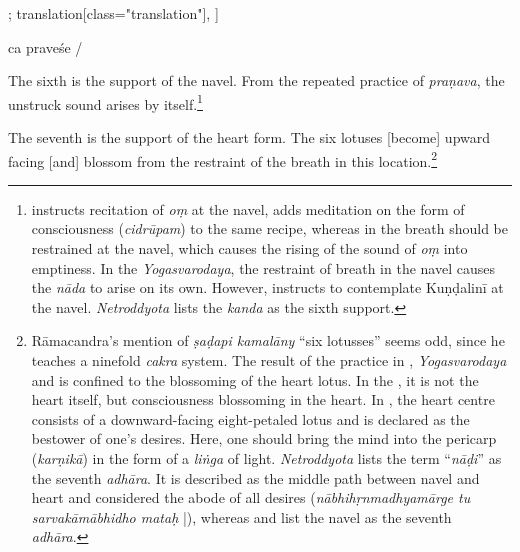 \begin{alignment}[
  texts=edition[class="edition"];
  translation[class="translation"],
  ]
\begin{edition}
\begin{prose}
{  }
ca 
praveśe
/
    \end{prose}
  \end{edition}
  \begin{translation}
    \begin{tlate}
      \noindent
      The sixth is the support of the navel. From the repeated practice of \textit{praṇava}, the unstruck sound arises by itself.\footnote{ instructs recitation of \textit{oṃ} at the navel,  adds meditation on the form of consciousness (\textit{cidrūpam}) to the same recipe, whereas in  the breath should be restrained at the navel, which causes the rising of the sound of \textit{oṃ} into emptiness. In the \textit{Yogasvarodaya}, the restraint of breath in the navel causes the \textit{nāda} to arise on its own. However,  instructs to contemplate Kuṇḍalinī at the navel. \textit{Netroddyota} lists the \textit{kanda} as the sixth support.}

     The seventh is the support of the heart form. The six lotuses [become] upward facing [and] blossom from the restraint of the breath in this location.\footnote{Rāmacandra's mention of \textit{ṣaḍapi kamalāny} ``six lotusses'' seems odd, since he teaches a ninefold \textit{cakra} system. The result of the practice in , \textit{Yogasvarodaya} and  is confined to the blossoming of the heart lotus. In the , it is not the heart itself, but consciousness blossoming in the heart. In , the heart centre consists of a downward-facing eight-petaled lotus and is declared as the bestower of one's desires. Here, one should bring the mind into the pericarp (\textit{karṇikā}) in the form of a \textit{liṅga} of light. \textit{Netroddyota} lists the term ``\textit{nāḍi}'' as the seventh \textit{adhāra}. It is described as the middle path between navel and heart and considered the abode of all desires (\textit{nābhihṛnmadhyamārge tu sarvakāmābhidho mataḥ} |), whereas  and  list the navel as the seventh \textit{adhāra}.}


\end{tlate}
\end{translation}
\end{alignment}
